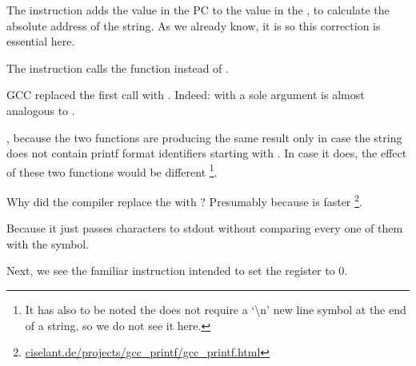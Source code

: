 The  instruction adds the value in the \ac{PC} to the value in the , to calculate the absolute address of the  string. 
As we already know, it is \q{\PICcode} so this correction is essential here.

The  instruction calls the \puts function instead of \printf.

\label{puts}

GCC replaced the first \printf call with \puts.
Indeed: \printf with a sole argument is almost analogous to \puts. 

, because the two functions are producing the same result only in case the 
string does not contain printf format identifiers starting with \IT{\%}. 
In case it does, the effect of these two functions would be different
\footnote{It has also to be noted the \puts does not require a `\textbackslash{}n' new line symbol 
at the end of a string, so we do not see it here.}.

Why did the compiler replace the \printf with \puts? Presumably because \puts is faster
\footnote{\href{http://go.yurichev.com/17063}{ciselant.de/projects/gcc\_printf/gcc\_printf.html}}. 

Because it just passes characters to \gls{stdout} without comparing every one of them with the \IT{\%} symbol.

Next, we see the familiar  instruction intended to set the  register to 0.
